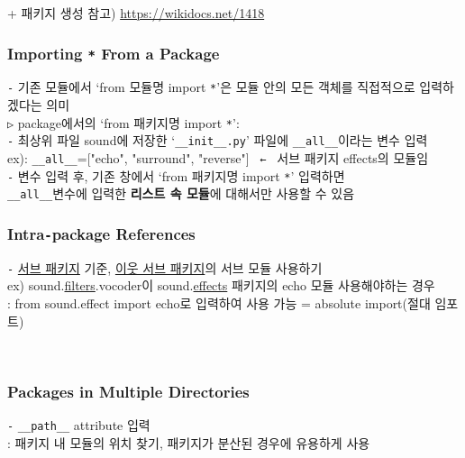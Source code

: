 \documentclass[11pt,a4paper]{article}
\begin{document}
+ 패키지 생성 참고) \url{https://wikidocs.net/1418}

\subsubsection{\Large\textbf{Importing \texttt{*} From a Package}}
\begin{spacing}{1.5}
\texttt{-} 기존 모듈에서 `from 모듈명 import \texttt{*}'은 모듈 안의 모든 객체를 직접적으로 입력하겠다는 의미\\

\texttt{▷} package에서의 `from 패키지명 import \texttt{*}':\\
\texttt{-} 최상위 파일 sound에 저장한 `\verb|__init__.py|' 파일에 \verb|__all__|이라는 변수 입력\\
\hspace*{2em}ex): \verb|__all__|=["echo", "surround", "reverse"] \texttt{ ← } 서브 패키지 effects의 모듈임\\
\texttt{-} 변수 입력 후, 기존 창에서 `from 패키지명 import \texttt{*}' 입력하면\\
\hspace*{2em}\verb|__all__|변수에 입력한 \textbf{리스트 속 모듈}에 대해서만 사용할 수 있음\\
\end{spacing}

\subsubsection{\Large\textbf{Intra\texttt{-}package References}}
\begin{spacing}{1.5}
\texttt{-} \underline{서브 패키지} 기준, \underline{이웃 서브 패키지}의 서브 모듈 사용하기\\
\hspace*{2em}ex) sound.\underline{filters}.vocoder이 sound.\underline{effects} 패키지의 echo 모듈 사용해야하는 경우\\
\hspace*{2em}: from sound.effect import echo로 입력하여 사용 가능 = absolute import(절대 임포트)
\end{spacing}\\

\subsubsection{\Large\textbf{Packages in Multiple Directories}}
\texttt{-} \verb|__path__| attribute 입력\\
\hspace*{2em}: 패키지 내 모듈의 위치 찾기, 패키지가 분산된 경우에 유용하게 사용
\end{document}
